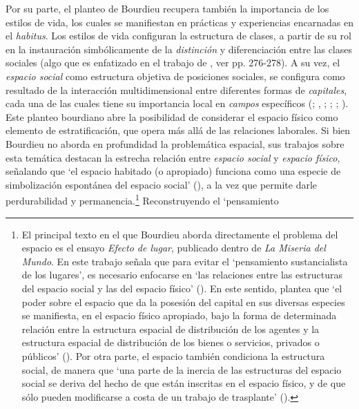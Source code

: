\documentclass[
  spanish,
  a4paper,%
  chapterprefix=true,%
  DIV=calc,%
  twoside]{scrbook}%
\begin{document}
Por su parte, el planteo de Bourdieu recupera también la importancia de
los estilos de vida, los cuales se manifiestan en prácticas y
experiencias encarnadas en el \emph{habitus}. Los estilos de vida configuran
la estructura de clases, a partir de su rol en la instauración
simbólicamente de la \emph{distinción} y diferenciación entre las clases
sociales (algo que es enfatizado en el trabajo de , ver pp.
276-278). A su vez, el \emph{espacio social} como estructura objetiva de
posiciones sociales, se configura como resultado de la interacción
multidimensional entre diferentes formas de \emph{capitales}, cada una de las
cuales tiene su importancia local en \emph{campos} específicos
(; , ; ; ; ). Este planteo bourdiano abre la
posibilidad de considerar el espacio físico como elemento de
estratificación, que opera más allá de las relaciones laborales. Si bien
Bourdieu no aborda en profundidad la problemática espacial, sus trabajos
sobre esta temática destacan la estrecha relación entre \emph{espacio social}
y \emph{espacio físico}, señalando que `el espacio habitado (o apropiado)
funciona como una especie de simbolización espontánea del espacio
social' (), a la vez que permite darle perdurabilidad
y permanencia.\footnote{El principal texto en el que Bourdieu aborda
  directamente el problema del espacio es el ensayo \emph{Efecto de lugar},
  publicado dentro de \emph{La Miseria del Mundo}. En este trabajo señala
  que para evitar el `pensamiento sustancialista de los lugares', es
  necesario enfocarse en `las relaciones entre las estructuras del
  espacio social y las del espacio físico' (). En
  este sentido, plantea que `el poder sobre el espacio que da la
  posesión del capital en sus diversas especies se manifiesta, en el
  espacio físico apropiado, bajo la forma de determinada relación
  entre la estructura espacial de distribución de los agentes y la
  estructura espacial de distribución de los bienes o servicios,
  privados o públicos' (). Por otra parte, el
  espacio también condiciona la estructura social, de manera que `una
  parte de la inercia de las estructuras del espacio social se deriva
  del hecho de que están inscritas en el espacio físico, y de que sólo
  pueden modificarse a costa de un trabajo de trasplante'
  ().} Reconstruyendo el `pensamiento
\end{document}
